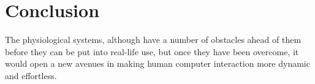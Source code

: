 \documentclass[10pt,a4paper]{article}
\begin{document}
\section{Conclusion}
The physiological systems, although have a number of obstacles ahead of them before they can be put into real-life use, but once they have been overcome, it would open a new avenues in making human computer interaction more dynamic and effortless. 



\end{document}
